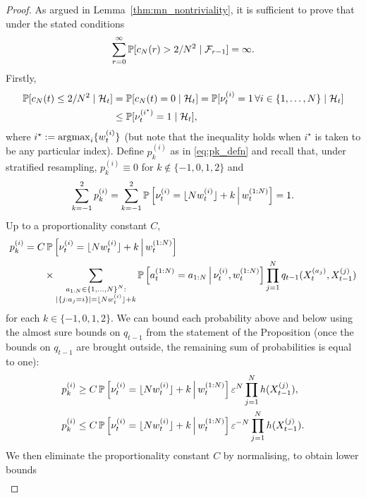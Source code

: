 \begin{proof}
As argued in Lemma~\ref{thm:mn_nontriviality}, it is sufficient to prove that under the stated conditions
\begin{equation*}
\sum_{r=0}^\infty \mathbb{P}[ c_N(r) > 2/N^2  \mid \mathcal{F}_{r-1} ] = \infty .
\end{equation*}
Firstly,
\begin{align}
\mathbb{P}[ c_N(t) \leq 2/N^2 \mid \mathcal{H}_t ]
&= \mathbb{P}[ c_N(t) =0 \mid \mathcal{H}_t ]
= \mathbb{P}[ \nu_t^{(i)} =1 \,\forall i\in\{1,\dots,N\} \mid \mathcal{H}_t ] \notag\\
&\leq \mathbb{P}[ \nu_t^{(i^\star)} =1 \mid \mathcal{H}_t ] , \label{eq:cNnonzero}
\end{align}
where $i^\star := \operatorname*{argmax}_i \{ w_t^{(i)} \}$ (but note that the inequality holds when $i^\star$ is taken to be any particular index).
Define $p_k^{(i)}$ as in \eqref{eq:pk_defn} and recall that, under stratified resampling, $p_k^{(i)} \equiv 0$ for $k\notin \{-1,0,1,2\}$ and
\begin{equation*}
\sum_{k=-1}^2 p_k^{(i)} 
= \sum_{k=-1}^2 \mathbb{P} \left[ \nu_t^{(i)} = \lfloor N w_t^{(i)} \rfloor + k \,\middle|\, w_t^{(1:N)} \right]
= 1 .
\end{equation*}
Up to a proportionality constant $C$,
\begin{align*}
p_k^{(i)} 
&= C \, \mathbb{P} \left[ \nu_t^{(i)} = \lfloor N w_t^{(i)} \rfloor + k \,\middle|\, w_t^{(1:N)} \right] \\
    &\qquad \times \sum_{\substack{a_{1:N} \in \{1,\dots,N\}^N : 
        \\ |\{j: a_j=i\}|=\lfloor N w_t^{(i)} \rfloor +k }}
        \mathbb{P}\left[ a_t^{(1:N)} = a_{1:N} \,\middle|\, \nu_t^{(i)}, w_t^{(1:N)} \right]
        \prod_{j=1}^N q_{t-1}( X_t^{(a_j)}, X_{t-1}^{(j)} ) 
\end{align*}
for each $k\in\{-1,0,1,2\}$.
We can bound each probability above and below using the almost sure bounds on $q_{t-1}$ from the statement of the Proposition (once the bounds on $q_{t-1}$ are brought outside, the remaining sum of probabilities is equal to one):
\begin{align*}
p_k^{(i)}
&\geq C \, \mathbb{P} \left[ \nu_t^{(i)} = \lfloor N w_t^{(i)} \rfloor + k \,\middle|\, w_t^{(1:N)} \right] \varepsilon^N
        \prod_{j=1}^N h(X_{t-1}^{(j)}) , \\
p_k^{(i)}
&\leq C \, \mathbb{P} \left[ \nu_t^{(i)} = \lfloor N w_t^{(i)} \rfloor + k \,\middle|\, w_t^{(1:N)} \right] 
        \varepsilon^{-N} \prod_{j=1}^N h(X_{t-1}^{(j)}) .
\end{align*}
We then eliminate the proportionality constant $C$ by normalising, to obtain lower bounds
\begin{align}

\end{align}
\end{proof}
